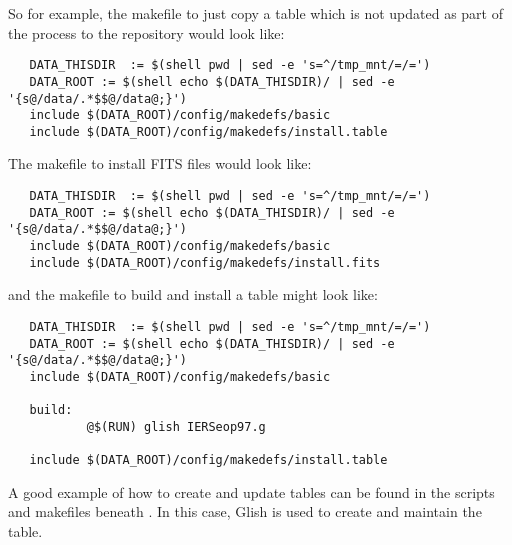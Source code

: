 So for example, the makefile to just copy a table which is not updated as
part of the  process to the repository would look like:

\begin{verbatim}
   DATA_THISDIR  := $(shell pwd | sed -e 's=^/tmp_mnt/=/=')
   DATA_ROOT := $(shell echo $(DATA_THISDIR)/ | sed -e '{s@/data/.*$$@/data@;}')
   include $(DATA_ROOT)/config/makedefs/basic
   include $(DATA_ROOT)/config/makedefs/install.table
\end{verbatim}

\noindent
The makefile to install FITS files would look like:

\begin{verbatim}
   DATA_THISDIR  := $(shell pwd | sed -e 's=^/tmp_mnt/=/=')
   DATA_ROOT := $(shell echo $(DATA_THISDIR)/ | sed -e '{s@/data/.*$$@/data@;}')
   include $(DATA_ROOT)/config/makedefs/basic
   include $(DATA_ROOT)/config/makedefs/install.fits
\end{verbatim}

\noindent
and the makefile to build and install a table might look like:

\begin{verbatim}
   DATA_THISDIR  := $(shell pwd | sed -e 's=^/tmp_mnt/=/=')
   DATA_ROOT := $(shell echo $(DATA_THISDIR)/ | sed -e '{s@/data/.*$$@/data@;}')
   include $(DATA_ROOT)/config/makedefs/basic

   build:
           @$(RUN) glish IERSeop97.g

   include $(DATA_ROOT)/config/makedefs/install.table
\end{verbatim}

\noindent
A good example of how to create and update tables can be found in the
scripts and makefiles beneath . In this
case, Glish is used to create and maintain the  table.
